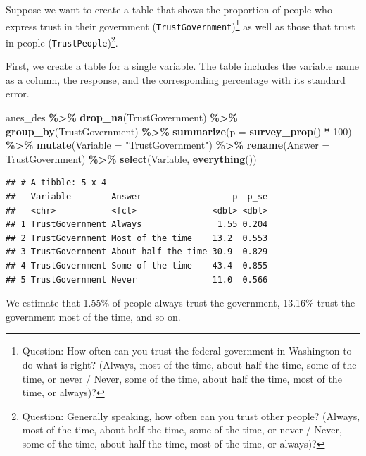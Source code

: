 \documentclass[
]{krantz}
\makeatletter
\newenvironment{Shaded}{\begin{snugshade}}{\end{snugshade}}
\newcommand{\AttributeTok}[1]{\textcolor[rgb]{0.27,0.27,0.27}{#1}}
\newcommand{\DecValTok}[1]{\textcolor[rgb]{0.06,0.06,0.06}{#1}}
\newcommand{\FunctionTok}[1]{\textcolor[rgb]{0.27,0.27,0.27}{\textbf{#1}}}
\newcommand{\NormalTok}[1]{#1}
\newcommand{\SpecialCharTok}[1]{\textcolor[rgb]{0.43,0.43,0.43}{\textbf{#1}}}
\newcommand{\StringTok}[1]{\textcolor[rgb]{0.5,0.5,0.5}{#1}}
\newenvironment{kframe}{%
\medskip{}
\setlength{\fboxsep}{.8em}
 \def\at@end@of@kframe{}%
 \ifinner\ifhmode%
  \def\at@end@of@kframe{\end{minipage}}%
  \begin{minipage}{\columnwidth}%
 \fi\fi%
 \def\FrameCommand##1{\hskip\@totalleftmargin \hskip-\fboxsep
 \colorbox{shadecolor}{##1}\hskip-\fboxsep
     \hskip-\linewidth \hskip-\@totalleftmargin \hskip\columnwidth}%
 \MakeFramed {\advance\hsize-\width
   \@totalleftmargin\z@ \linewidth\hsize
   \@setminipage}}%
 {\par\unskip\endMakeFramed%
 \at@end@of@kframe}
\renewenvironment{Shaded}{\begin{kframe}}{\end{kframe}}
\makeatother
\begin{document}
Suppose we want to create a table that shows the proportion of people who express trust in their government (\texttt{TrustGovernment})\footnote{Question: How often can you trust the federal government in Washington to do what is right? (Always, most of the time, about half the time, some of the time, or never / Never, some of the time, about half the time, most of the time, or always)?} as well as those that trust in people (\texttt{TrustPeople})\footnote{Question: Generally speaking, how often can you trust other people? (Always, most of the time, about half the time, some of the time, or never / Never, some of the time, about half the time, most of the time, or always)?}.

First, we create a table for a single variable. The table includes the variable name as a column, the response, and the corresponding percentage with its standard error.

\begin{Shaded}
\begin{Highlighting}[]
\NormalTok{anes\_des }\SpecialCharTok{\%\textgreater{}\%}
  \FunctionTok{drop\_na}\NormalTok{(TrustGovernment) }\SpecialCharTok{\%\textgreater{}\%}
  \FunctionTok{group\_by}\NormalTok{(TrustGovernment) }\SpecialCharTok{\%\textgreater{}\%}
  \FunctionTok{summarize}\NormalTok{(}\AttributeTok{p =} \FunctionTok{survey\_prop}\NormalTok{() }\SpecialCharTok{*} \DecValTok{100}\NormalTok{) }\SpecialCharTok{\%\textgreater{}\%}
  \FunctionTok{mutate}\NormalTok{(}\AttributeTok{Variable =} \StringTok{"TrustGovernment"}\NormalTok{) }\SpecialCharTok{\%\textgreater{}\%}
  \FunctionTok{rename}\NormalTok{(}\AttributeTok{Answer =}\NormalTok{ TrustGovernment) }\SpecialCharTok{\%\textgreater{}\%}
  \FunctionTok{select}\NormalTok{(Variable, }\FunctionTok{everything}\NormalTok{())}
\end{Highlighting}
\end{Shaded}

\begin{verbatim}
## # A tibble: 5 x 4
##   Variable        Answer                  p  p_se
##   <chr>           <fct>               <dbl> <dbl>
## 1 TrustGovernment Always               1.55 0.204
## 2 TrustGovernment Most of the time    13.2  0.553
## 3 TrustGovernment About half the time 30.9  0.829
## 4 TrustGovernment Some of the time    43.4  0.855
## 5 TrustGovernment Never               11.0  0.566
\end{verbatim}

We estimate that 1.55\% of people always trust the government, 13.16\% trust the government most of the time, and so on.
\end{document}
